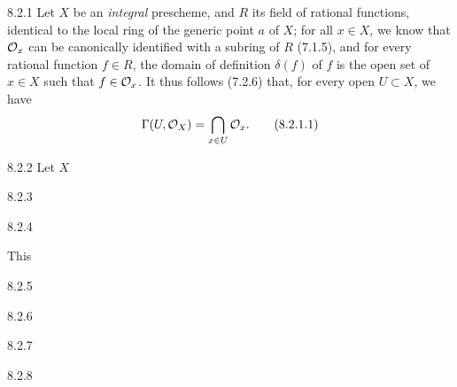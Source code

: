 \documentclass[../main.tex]{subfiles}
\begin{document}
\begin{cx}{8.2.1}
    Let $X$ be an \emph{integral} prescheme, and $R$ its field of rational functions, identical to the local ring of the generic point $a$ of $X$; for all $x\in X$, we know that $\mathcal{O}_x$ can be canonically identified with a subring of $R$ (7.1.5), and for every rational function $f\in R$, the domain of definition $\delta(f)$ of $f$ is the open set of $x\in X$ such that $f\in\mathcal{O}_x$.
    It thus follows (7.2.6) that, for every open $U\subset X$, we have
    \begin{equation*}
        \Gamma(U,\mathcal{O}_X) = \bigcap_{x\in U}\mathcal{O}_x.\tag{8.2.1.1}
    \end{equation*}
\end{cx}

\begin{cx}[Proposition]{8.2.2}
    Let $X$ 
\end{cx}

\begin{cx}[Corollary]{8.2.3}
\end{cx}

\begin{cx}[Corollary]{8.2.4}
\end{cx}

This

\begin{cx}[Corollary]{8.2.5}
\end{cx}

\begin{cx}{8.2.6}
\end{cx}

\begin{cx}[Proposition]{8.2.7}
\end{cx}

\begin{cx}[Proposition]{8.2.8}
\end{cx}

\end{document}
